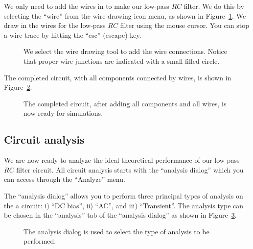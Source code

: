 \documentclass{article}
\begin{document}
We only need to add the wires in to make our low-pass $RC$ filter.  We do this by selecting the ``wire'' from the wire drawing icon menu, as shown in Figure~\ref{fig:5spice:adding_wires}.  We draw in the wires for the low-pass $RC$ filter using the mouse cursor.  You can stop a wire trace by hitting the ``esc'' (escape) key.

\begin{figure}
\begin{center}
\end{center}
\caption{We select the wire drawing tool to add the wire connections.  Notice that proper wire junctions are indicated with a small filled circle.}
\label{fig:5spice:adding_wires}
\end{figure}

The completed circuit, with all components connected by wires, is shown in Figure~\ref{fig:5spice:added_wires}.

\begin{figure}
\begin{center}
\end{center}
\caption{The completed circuit, after adding all components and all wires, is now ready for simulations.}
\label{fig:5spice:added_wires}
\end{figure}


\subsection{Circuit analysis}
We are now ready to analyze the ideal theoretical performance of our low-pass $RC$ filter circuit. All circuit analysis starts with the ``analysis dialog'' which you can access through the ``Analyze'' menu.

The ``analysis dialog'' allows you to perform three principal types of analysis on the a circuit: i) ``DC bias'', ii) ``AC'', and iii) ``Transient''. The analysis type can be chosen in the  ``analysis'' tab of the ``analysis dialog'' as shown in Figure~\ref{fig:5spice:select_analysis}.

\begin{figure}
\begin{center}
\end{center}
\caption{The analysis dialog is used to select the type of analysis to be performed.}
\label{fig:5spice:select_analysis}
\end{figure}
\end{document}
